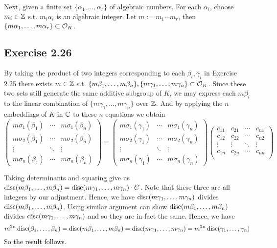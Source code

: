 \documentclass[../Marcus.tex]{subfiles}
\begin{document}
Next, given a finite set $\{\alpha_1,\ldots,\alpha_r\}$ of algebraic numbers. For each $\alpha_i$, choose $m_i\in \mathbb{Z}$ s.t. $m_i\alpha_i$ is an algebraic integer. Let $m:=m_1\cdots m_r$, then $\{m\alpha_1,\ldots,m\alpha_r\} \subset \mathcal{O}_K$.

\subsection*{Exercise 2.26}

By taking the product of two integers corresponding to each $\beta_i,\gamma_i$ in Exercise 2.25 there exists $m\in\mathbb{Z}$ s.t. $\{m\beta_1,\ldots,m\beta_n\},\{m\gamma_1,\ldots,m\gamma_n\}\subset\mathcal{O}_K$. Since these two sets still generate the same additive subgroup of $K$, we may express each $m\beta_i$ to the linear combination of $\{m\gamma_1,\ldots,m\gamma_n\}$ over $\mathbb{Z}$. And by applying the $n$ embeddings of $K$ in $\mathbb{C}$ to these $n$ equations we obtain
$$\begin{pmatrix}
    m\sigma_1(\beta_1)  &  \cdots & m\sigma_1(\beta_n)  \\
    m\sigma_2(\beta_1) &  \cdots & m\sigma_2(\beta_n)  \\
    \vdots                         &  \ddots & \vdots  \\
    m\sigma_n(\beta_1) &  \cdots & m\sigma_n(\beta_n)
\end{pmatrix}
=
\begin{pmatrix}
    m\sigma_1(\gamma_1)  &  \cdots & m\sigma_1(\gamma_n)  \\
    m\sigma_2(\gamma_1) &  \cdots & m\sigma_2(\gamma_n)  \\
    \vdots                         &  \ddots & \vdots  \\
    m\sigma_n(\gamma_1) &  \cdots & m\sigma_n(\gamma_n)
\end{pmatrix}
\begin{pmatrix}
    c_{11}  & c_{21} & \cdots & c_{n1} \\
    c_{12} & c_{22} & \cdots & c_{n2} \\
    \vdots & \vdots  & \ddots & \vdots \\
    c_{1n} & c_{2n} & \cdots & c_{nn} \\
\end{pmatrix}
$$

Taking determinants and squaring give us $\operatorname{disc}(m\beta_1,\ldots,m\beta_n)=\operatorname{disc}(m\gamma_1,\ldots,m\gamma_n)\cdot C$. Note that these three are all integers by our adjustment. Hence, we have $\operatorname{disc}(m\gamma_1,\ldots,m\gamma_n)$ divides $\operatorname{disc}(m\beta_1,\ldots,m\beta_n)$. Using similar argument can show $\operatorname{disc}(m\beta_1,\ldots,m\beta_n)$ divides $\operatorname{disc}(m\gamma_1,\ldots,m\gamma_n)$ and so they are in fact the same. Hence, we have $$m^{2n}\operatorname{disc}(\beta_1,\ldots,\beta_n)=\operatorname{disc}(m\beta_1,\ldots,m\beta_n)=\operatorname{disc}(m\gamma_1,\ldots,m\gamma_n)=m^{2n}\operatorname{disc}(\gamma_1,\ldots,\gamma_n)$$ So the result follows.
\end{document}
